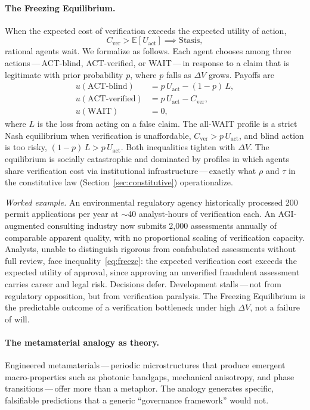 \documentclass[runningheads]{llncs}
\begin{document}
\paragraph{The Freezing Equilibrium.}
When the expected cost of verification exceeds the expected utility of action,
\begin{equation}
C_{\mathrm{ver}} > \mathbb{E}[U_{\mathrm{act}}] \implies \text{Stasis},
\label{eq:freeze}
\end{equation}
rational agents wait. We formalize as follows. Each agent chooses among three actions\,---\,ACT-blind, ACT-verified, or WAIT\,---\,in response to a claim that is legitimate with prior probability $p$, where $p$ falls as $\Delta V$ grows. Payoffs are
\begin{align*}
u(\text{ACT-blind}) &= p\,U_{\mathrm{act}} - (1-p)\,L, \\
u(\text{ACT-verified}) &= p\,U_{\mathrm{act}} - C_{\mathrm{ver}}, \\
u(\text{WAIT}) &= 0,
\end{align*}
where $L$ is the loss from acting on a false claim. The all-WAIT profile is a strict Nash equilibrium when verification is unaffordable, $C_{\mathrm{ver}} > p\,U_{\mathrm{act}}$, and blind action is too risky, $(1-p)\,L > p\,U_{\mathrm{act}}$. Both inequalities tighten with $\Delta V$. The equilibrium is socially catastrophic and dominated by profiles in which agents share verification cost via institutional infrastructure\,---\,exactly what $\rho$ and $\tau$ in the constitutive law (Section~\ref{sec:constitutive}) operationalize.

\emph{Worked example.} An environmental regulatory agency historically processed 200 permit applications per year at $\sim$40 analyst-hours of verification each. An AGI-augmented consulting industry now submits 2{,}000 assessments annually of comparable apparent quality, with no proportional scaling of verification capacity. Analysts, unable to distinguish rigorous from confabulated assessments without full review, face inequality~\eqref{eq:freeze}: the expected verification cost exceeds the expected utility of approval, since approving an unverified fraudulent assessment carries career and legal risk. Decisions defer. Development stalls\,---\,not from regulatory opposition, but from verification paralysis. The Freezing Equilibrium is the predictable outcome of a verification bottleneck under high $\Delta V$, not a failure of will.

\paragraph{The metamaterial analogy as theory.}
Engineered metamaterials\,---\,periodic microstructures that produce emergent macro-properties such as photonic bandgaps, mechanical anisotropy, and phase transitions\,---\,offer more than a metaphor. The analogy generates specific, falsifiable predictions that a generic ``governance framework'' would not.
\end{document}
